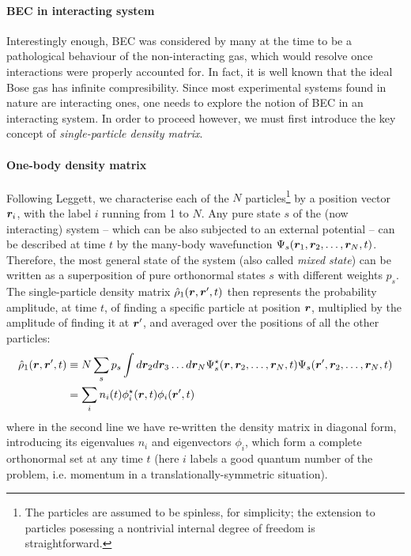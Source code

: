 \paragraph{BEC in interacting system}
Interestingly enough, BEC was considered by many at the time to be a
pathological behaviour of the non-interacting gas, which would resolve
once interactions were properly accounted for. In fact, it is well
known that the ideal Bose gas has infinite compresibility. Since most
experimental systems found in nature are interacting ones, one needs
to explore the notion of BEC in an interacting system. In order to
proceed however, we must first introduce the key concept of
\textit{single-particle density matrix}.

\paragraph{One-body density matrix}
Following Leggett, we characterise each of the $N$
particles\footnote{The particles are assumed to be spinless, for
  simplicity; the extension to particles posessing a nontrivial
  internal degree of freedom is straightforward.} by a position vector
$\bm{r}_i$, with the label $i$ running from 1 to $N$. Any pure state $s$
of the (now interacting) system -- which can be also subjected to an
external potential -- can be described at time $t$ by the many-body
wavefunction $\Psi_s(\bm{r}_1,\bm{r}_2,\dots,\bm{r}_N,t)$. Therefore, the most
general state of the system (also called \textit{mixed state}) can be
written as a superposition of pure orthonormal states $s$ with
different weights $p_s$. The single-particle density matrix
$\hat{\rho}_1(\bm{r},\bm{r}^{\prime},t)$ then represents the probability
amplitude, at time $t$, of finding a specific particle at position
$\bm{r}$, multiplied by the amplitude of finding it at $\bm{r}^{\prime}$,
and averaged over the positions of all the other particles:
%
\begin{align}\label{eq:one-particle-rho}
  \hat{\rho}_1(\bm{r},\bm{r}^{\prime},t) & \equiv N \sum_s p_s \int d\bm{r}_2d\bm{r}_3\dots
d\bm{r}_N
\Psi_s^{\star}(\bm{r},\bm{r}_2,\dots,\bm{r}_N,t)\Psi_s(\bm{r}^{\prime},\bm{r}_2,\dots,\bm{r}_N,t)\nonumber\\
& = \sum_i n_i(t) \phi_i^{\star}(\bm{r},t) \phi_i(\bm{r}^{\prime},t)
\end{align}
% 
where in the second line we have re-written the density matrix in
diagonal form, introducing its eigenvalues $n_i$ and eigenvectors
$\phi_i$, which form a complete orthonormal set at any time $t$ (here
$i$ labels a good quantum number of the problem, i.e. momentum in a
translationally-symmetric situation).

